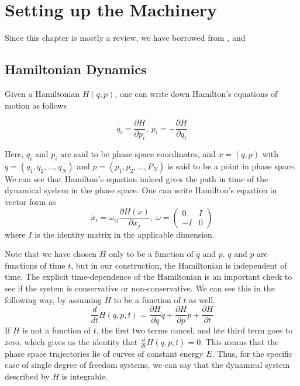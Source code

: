 
\chapter{Setting up the Machinery} %

\label{ChapterX} %


Since this chapter is mostly a review, we have borrowed from \cite{strogatz_2015}, \cite{tabor_1989} and \cite{ott_2008} 
\section{Hamiltonian Dynamics}
Given a Hamiltonian $H(q,p)$, one can write down Hamilton's equations of motion as follows

$$\dot{q_i} = \frac{\partial H}{\partial p_i}, \ \dot{p_i} = -\frac{\partial H}{\partial q_i} $$

Here, $q_i$ and $p_i$ are said to be phase space coordinates, and $x=(q,p)$ with $q=(q_1,q_2,\ldots,q_N)$ and $p=(p_1,p_2,\ldots,P_N)$ is said to be a point in phase space. We can see that Hamilton's equation indeed gives the path in time of the dynamical system in the phase space. One can write Hamilton's equation in vector form as
$$\dot{x_i} = \omega_{ij} \frac{\partial H(x)}{\partial x_j}, \ \omega = \left(\begin{array}{cc} 0 & I\\ -I & 0 \end{array}\right)$$
where $I$ is the identity matrix in the applicable dimension.

Note that we have chosen $H$ only to be a function of $q$ and $p$. $q$ and $p$ are functions of time $t$, but in our construction, the Hamiltonian is independent of time. The explicit time-dependence of the Hamiltonian is an important check to see if the system is conservative or non-conservative. We can see this in the following way, by assuming $H$ to be a function of $t$ as well.
$$\frac{d}{dt}H(q,p,t)=\frac{\partial H}{\partial q}\dot{q} + \frac{\partial H}{\partial p}\dot{p} + \frac{\partial H}{\partial t}$$
If $H$ is not a function of $t$, the first two terms cancel, and hte third term goes to zero, which gives us the identity that $\frac{d}{dt}H(q,p,t)=0$. This means that the phase space trajectories lie of curves of constant energy $E$. Thus, for the specific case of single degree of freedom systems, we can say that the dynamical system described by $H$ is integrable.

